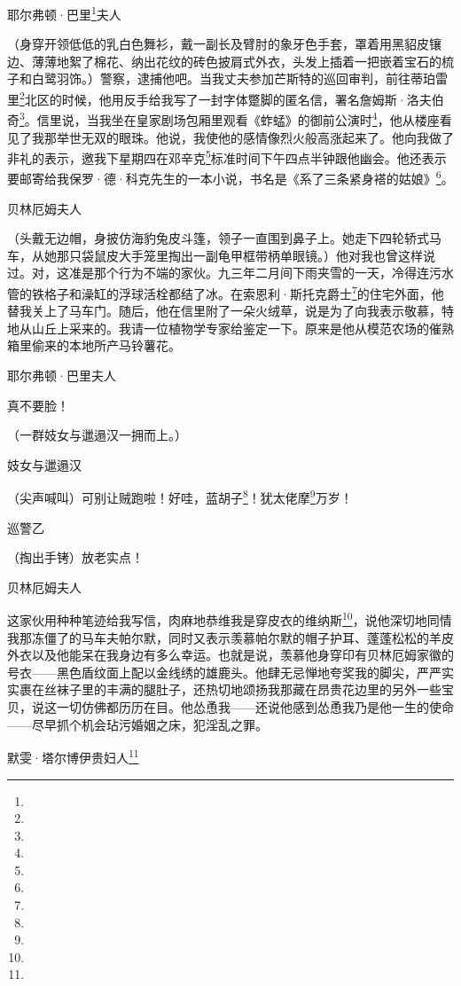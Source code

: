 \par 耶尔弗顿·巴里\footnote{}夫人
\par （身穿开领低低的乳白色舞衫，戴一副长及臂肘的象牙色手套，罩着用黑貂皮镶边、薄薄地絮了棉花、纳出花纹的砖色披肩式外衣，头发上插着一把嵌着宝石的梳子和白鹭羽饰。）警察，逮捕他吧。当我丈夫参加芒斯特的巡回审判，前往蒂珀雷里\footnote{}北区的时候，他用反手给我写了一封字体蹩脚的匿名信，署名詹姆斯·洛夫伯奇\footnote{}。信里说，当我坐在皇家剧场包厢里观看《蚱蜢》的御前公演时\footnote{}，他从楼座看见了我那举世无双的眼珠。他说，我使他的感情像烈火般高涨起来了。他向我做了非礼的表示，邀我下星期四在邓辛克\footnote{}标准时间下午四点半钟跟他幽会。他还表示要邮寄给我保罗·德·科克先生的一本小说，书名是《系了三条紧身褡的姑娘》\footnote{}。
\par 贝林厄姆夫人
\par （头戴无边帽，身披仿海豹兔皮斗篷，领子一直围到鼻子上。她走下四轮轿式马车，从她那只袋鼠皮大手笼里掏出一副龟甲框带柄单眼镜。）他对我也曾这样说过。对，这准是那个行为不端的家伙。九三年二月间下雨夹雪的一天，冷得连污水管的铁格子和澡缸的浮球活栓都结了冰。在索恩利·斯托克爵士\footnote{}的住宅外面，他替我关上了马车门。随后，他在信里附了一朵火绒草，说是为了向我表示敬慕，特地从山丘上采来的。我请一位植物学专家给鉴定一下。原来是他从模范农场的催熟箱里偷来的本地所产马铃薯花。
\par 耶尔弗顿·巴里夫人
\par 真不要脸！
\par （一群妓女与邋遢汉一拥而上。）
\par 妓女与邋遢汉
\par （尖声喊叫）可别让贼跑啦！好哇，蓝胡子\footnote{}！犹太佬摩\footnote{}万岁！
\par 巡警乙
\par （掏出手铐）放老实点！
\par 贝林厄姆夫人
\par 这家伙用种种笔迹给我写信，肉麻地恭维我是穿皮衣的维纳斯\footnote{}，说他深切地同情我那冻僵了的马车夫帕尔默，同时又表示羡慕帕尔默的帽子护耳、蓬蓬松松的羊皮外衣以及他能呆在我身边有多么幸运。也就是说，羡慕他身穿印有贝林厄姆家徽的号衣——黑色盾纹面上配以金线绣的雄鹿头。他肆无忌惮地夸奖我的脚尖，严严实实裹在丝袜子里的丰满的腿肚子，还热切地颂扬我那藏在昂贵花边里的另外一些宝贝，说这一切仿佛都历历在目。他怂恿我——还说他感到怂恿我乃是他一生的使命——尽早抓个机会玷污婚姻之床，犯淫乱之罪。
\par 默雯·塔尔博伊贵妇人\footnote{}

